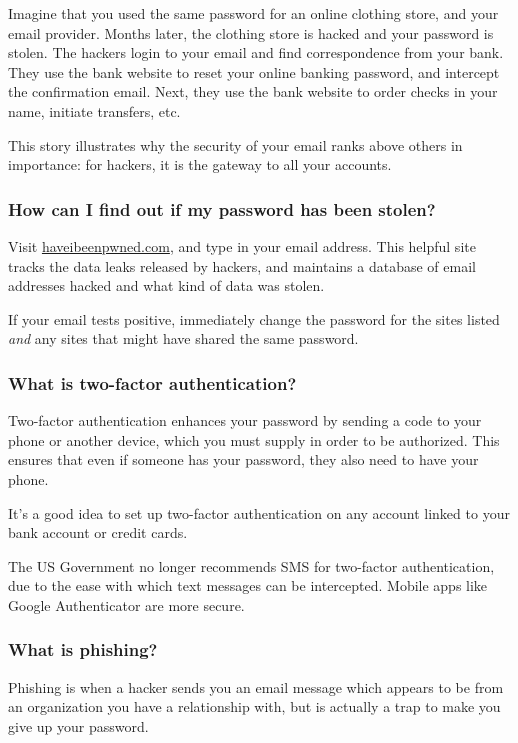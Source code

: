 Imagine that you used the same password for an online clothing store, and your email provider. Months later, the clothing store is hacked and your password is stolen. The hackers login to your email and find correspondence from your bank. They use the bank website to reset your online banking password, and intercept the confirmation email. Next, they use the bank website to order checks in your name, initiate transfers, etc.

This story illustrates why the security of your email ranks above others in importance: for hackers, it is the gateway to all your accounts.

\subsubsection{How can I find out if my password has been stolen?}

Visit \url{haveibeenpwned.com}, and type in your email address. This helpful site tracks the data leaks released by hackers, and maintains a database of email addresses hacked and what kind of data was stolen.

If your email tests positive, immediately change the password for the sites listed \textit{and} any sites that might have shared the same password. 

\subsubsection{What is two-factor authentication?}

Two-factor authentication enhances your password by sending a code to your phone or another device, which you must supply in order to be authorized. This ensures that even if someone has your password, they also need to have your phone.

It's a good idea to set up two-factor authentication on any account linked to your bank account or credit cards.

The US Government no longer recommends SMS for two-factor authentication, due to the ease with which text messages can be intercepted. Mobile apps like Google Authenticator are more secure.

\subsubsection{What is phishing?}

Phishing is when a hacker sends you an email message which appears to be from an organization you have a relationship with, but is actually a trap to make you give up your password.

